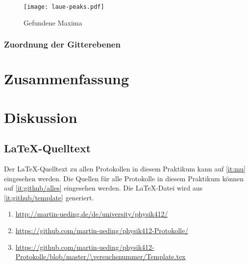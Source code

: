 \begin{figure}[htbp]
    \centering
    \texttt{[image: laue-peaks.pdf]}
    \caption{%
        Gefundene Maxima
    }
    \label{fig:}
\end{figure}

\subsection{Zuordnung der Gitterebenen}

\chapter{Zusammenfassung}

\chapter{Diskussion}


\FloatBarrier
\begin{appendix}
    \FloatBarrier
    \chapter{\LaTeX-Quelltext}

    Der \LaTeX-Quelltext zu allen Protokollen in diesem Praktikum kann auf
    \ref{it:mu} eingesehen werden. Die Quellen für alle Protokolle in diesem
    Praktikum können auf \ref{it:github/alles} eingesehen werden. Die
    \LaTeX-Datei wird aus \ref{it:github/template} generiert.

    \begin{enumerate}
        \item
            \label{it:mu}
            \url{http://martin-ueding.de/de/university/physik412/}
        \item
            \label{it:github/alles}
            \url{https://github.com/martin-ueding/physik412-Protokolle/}
        \item
            \label{it:github/template}
            \url{https://github.com/martin-ueding/physik412-Protokolle/blob/master/\versuchsnummer/Template.tex}
    \end{enumerate}
\end{appendix}


\FloatBarrier
\printbibliography



